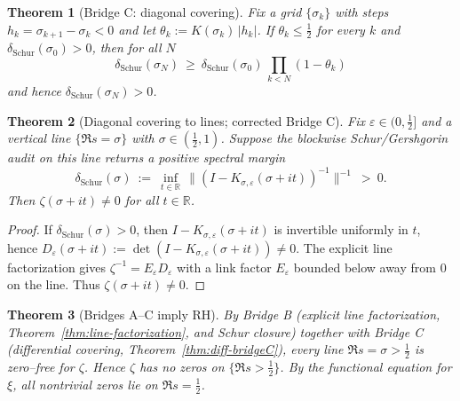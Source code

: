 \documentclass[11pt]{article}
\newtheorem{theorem}{Theorem}
\theoremstyle{definition}
\theoremstyle{remark}
\newcommand{\R}{\mathbb{R}}
\begin{document}
\begin{theorem}[Bridge C: diagonal covering]\label{thm:bridge-C-early}
Fix a grid $\{\sigma_k\}$ with steps $h_k=\sigma_{k+1}-\sigma_k<0$ and let $\theta_k:=K(\sigma_k)\,|h_k|$. If $\theta_k\le \tfrac12$ for every $k$ and $\delta_{\mathrm{Schur}}(\sigma_0)>0$, then for all $N$
\[
  \delta_{\mathrm{Schur}}(\sigma_N)\ \ge\ \delta_{\mathrm{Schur}}(\sigma_0)\,\prod_{k< N}(1-\theta_k)
\]
and hence $\delta_{\mathrm{Schur}}(\sigma_N)>0$.
\end{theorem}

\begin{theorem}[Diagonal covering to lines; corrected Bridge C]\label{thm:diag-cover-corrected-early}
Fix $\varepsilon\in(0,\tfrac12]$ and a vertical line $\{\Re s=\sigma\}$ with $\sigma\in(\tfrac12,1)$. Suppose the blockwise Schur/Gershgorin audit on this line returns a positive spectral margin 
\[
\delta_{\mathrm{Schur}}(\sigma)\ :=\ \inf_{t\in\mathbb{R}}\,\big\| (I-K_{\sigma,\varepsilon}(\sigma+it))^{-1}\big\|^{-1}\ >\ 0.
\]
Then $\zeta(\sigma+it)\neq 0$ for all $t\in\R$.
\end{theorem}

\begin{proof}
If $\delta_{\mathrm{Schur}}(\sigma)>0$, then $I-K_{\sigma,\varepsilon}(\sigma+it)$ is invertible uniformly in $t$, hence $D_\varepsilon(\sigma+it):=\det(I-K_{\sigma,\varepsilon}(\sigma+it))\neq 0$. The explicit line factorization gives $\zeta^{-1}=E_\varepsilon D_\varepsilon$ with a link factor $E_\varepsilon$ bounded below away from $0$ on the line. Thus $\zeta(\sigma+it)\neq 0$.
\end{proof}

\begin{theorem}[Bridges A--C imply RH]\label{thm:bridges-imply-RH}
By Bridge B (explicit line factorization, Theorem~\ref{thm:line-factorization}, and Schur closure) together with Bridge C (differential covering, Theorem~\ref{thm:diff-bridgeC}), every line $\Re s=\sigma>\tfrac12$ is zero–free for $\zeta$. Hence $\zeta$ has no zeros on $\{\Re s>\tfrac12\}$. By the functional equation for $\xi$, all nontrivial zeros lie on $\Re s=\tfrac12$.
\end{theorem}
\end{document}
